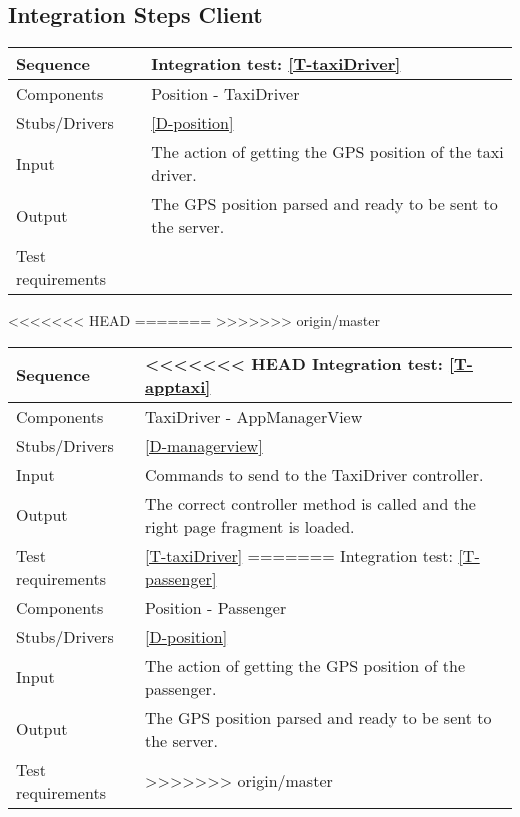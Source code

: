 \subsection{Integration Steps Client}

\begin{table}[H]
    \begin{tabularx}{\textwidth}{l|X}
        \hline
        Sequence
        & 
        Integration test: \ref{T-taxiDriver}
        \\ \hline
        Components 
        & 
        Position - TaxiDriver
        \\ \hline
        Stubs/Drivers 
        & 
        \ref{D-position}
        \\ \hline
        Input 
        & 
        The action of getting the GPS position of the taxi driver.
        \\ \hline
        Output 
        & 
        The GPS position parsed and ready to be sent to the server.
        \\ \hline
        Test requirements 
        & 
        
        \\ \hline
    \end{tabularx}
\end{table}

\begin{table}[H]
<<<<<<< HEAD
=======
>>>>>>> origin/master
    \begin{tabularx}{\textwidth}{l|X}
        \hline
        Sequence
        & 
<<<<<<< HEAD
        Integration test: \ref{T-apptaxi}
        \\ \hline
        Components 
        & 
        TaxiDriver - AppManagerView
        \\ \hline
        Stubs/Drivers 
        & 
        \ref{D-managerview}
        \\ \hline
        Input 
        & 
        Commands to send to the TaxiDriver controller.
        \\ \hline
        Output 
        & 
        The correct controller method is called and the right page fragment is loaded.
        \\ \hline
        Test requirements 
        & 
        \ref{T-taxiDriver}
=======
        Integration test: \ref{T-passenger}
        \\ \hline
        Components 
        & 
        Position - Passenger
        \\ \hline
        Stubs/Drivers 
        & 
        \ref{D-position}
        \\ \hline
        Input 
        & 
        The action of getting the GPS position of the passenger.
        \\ \hline
        Output 
        & 
        The GPS position parsed and ready to be sent to the server.
        \\ \hline
        Test requirements 
        & 
        
>>>>>>> origin/master
        \\ \hline
    \end{tabularx}
\end{table}

